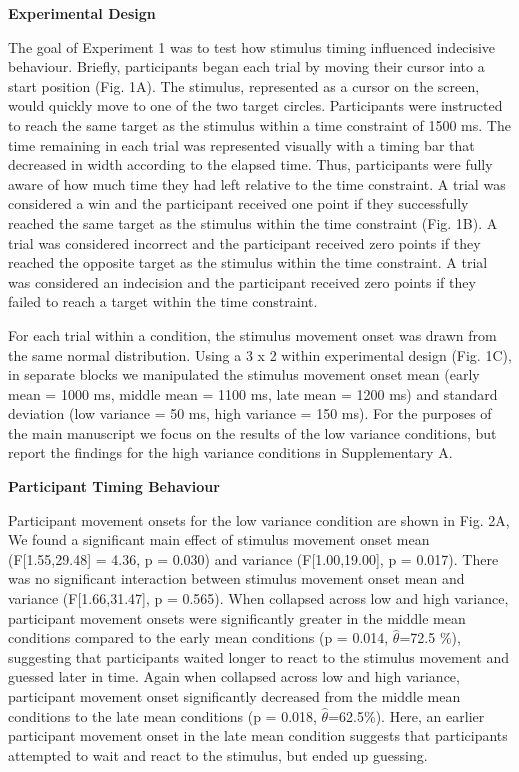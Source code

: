 \documentclass[12pt,letterpaper]{article}
\begin{document}
\noindent\textbf{\textcolor{mydarkblue}{{Experimental Design}}}
\vspace{2mm}

The goal of Experiment 1 was to test how stimulus timing influenced indecisive behaviour. Briefly, participants began each trial by moving their cursor into a start position (Fig. 1A). The stimulus, represented as a cursor on the screen, would quickly move to one of the two target circles. Participants were instructed to reach the same target as the stimulus within a time constraint of 1500 ms. The time remaining in each trial was represented visually with a timing bar that decreased in width according to the elapsed time. Thus, participants were fully aware of how much time they had left relative to the time constraint. A trial was considered a win and the participant received one point if they successfully reached the same target as the stimulus within the time constraint (Fig. 1B). A trial was considered incorrect and the participant received zero points if they reached the opposite target as the stimulus within the time constraint. A trial was considered an indecision and the participant received zero points if they failed to reach a target within the time constraint.

For each trial within a condition, the stimulus movement onset was drawn from the same normal distribution. Using a 3 x 2 within experimental design (Fig. 1C), in separate blocks we manipulated the stimulus movement onset mean (early mean = 1000 ms, middle mean = 1100 ms, late mean = 1200 ms) and standard deviation (low variance = 50 ms, high variance = 150 ms). For the purposes of the main manuscript we focus on the results of the low variance conditions, but report the findings for the high variance conditions in Supplementary A.

\noindent\textbf{\textcolor{mydarkblue}{{Participant Timing Behaviour}}}
\vspace{2mm}

Participant movement onsets for the low variance condition are shown in Fig. 2A, We found a significant main effect of stimulus movement onset mean (F[1.55,29.48] = 4.36, p = 0.030) and variance (F[1.00,19.00], p = 0.017). There was no significant interaction between stimulus movement onset mean and variance (F[1.66,31.47], p = 0.565). When collapsed across low and high variance, participant movement onsets were significantly greater in the middle mean conditions compared to the early mean conditions (p = 0.014, $\hat{\theta}$=72.5 \%), suggesting that participants waited longer to react to the stimulus movement and guessed later in time. Again when collapsed across low and high variance, participant movement onset significantly decreased from the middle mean conditions to the late mean conditions (p = 0.018, $\hat{\theta}$=62.5\%). Here, an earlier participant movement onset in the late mean condition suggests that participants attempted to wait and react to the stimulus, but ended up guessing.
\end{document}
